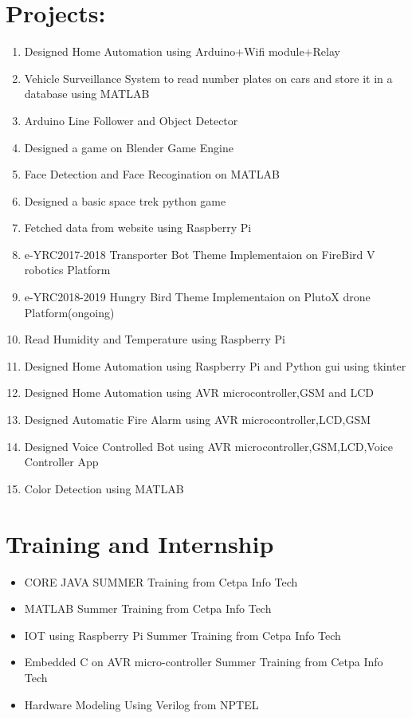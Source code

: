 \documentclass[11pt]{article}
\begin{document}
\section{Projects:}
\begin{enumerate}
 \item Designed Home Automation using Arduino+Wifi module+Relay
  \item Vehicle Surveillance System to read number plates on cars and store it in a database using MATLAB
  \item Arduino Line Follower and Object Detector 
 \item Designed a game on Blender Game Engine
   \item Face Detection and Face Recogination on MATLAB
 \item Designed a basic space trek python game
\item Fetched data from website using Raspberry Pi
 \item e-YRC2017-2018 Transporter Bot Theme Implementaion on FireBird V robotics Platform
 \item e-YRC2018-2019 Hungry Bird Theme Implementaion on PlutoX drone Platform(ongoing)
\item Read Humidity and Temperature using Raspberry Pi
\item Designed Home Automation using Raspberry Pi and Python gui using tkinter
\item Designed Home Automation using AVR microcontroller,GSM and LCD 
\item Designed Automatic Fire Alarm using AVR microcontroller,LCD,GSM
\item Designed Voice Controlled Bot using AVR microcontroller,GSM,LCD,Voice Controller App 
  \item Color Detection using MATLAB
\end{enumerate}
\section{Training and Internship}
\begin{itemize}
 \item CORE JAVA SUMMER Training from Cetpa Info Tech
\item MATLAB Summer Training from Cetpa Info Tech
\item IOT using Raspberry Pi Summer Training from Cetpa Info Tech
\item Embedded C on AVR micro-controller Summer Training from Cetpa Info Tech
\item Hardware Modeling Using Verilog from NPTEL

\end{itemize}
\newpage
\end{document}

